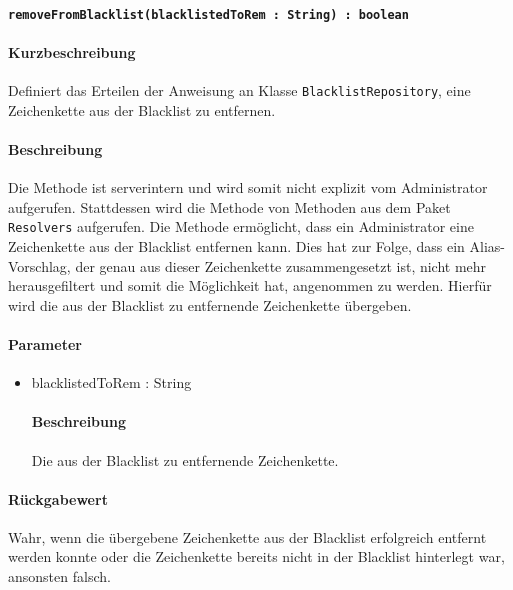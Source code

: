 \paragraph{\texttt{removeFromBlacklist(blacklistedToRem : String) : boolean}}%
\paragraph*{Kurzbeschreibung}
Definiert das Erteilen der Anweisung an Klasse \texttt{BlacklistRepository}, eine Zeichenkette aus der Blacklist zu entfernen.
\paragraph*{Beschreibung}
Die Methode ist serverintern und wird somit nicht explizit vom Administrator aufgerufen.
Stattdessen wird die Methode von Methoden aus dem Paket \texttt{Resolvers} aufgerufen.
Die Methode ermöglicht, dass ein Administrator eine Zeichenkette aus der Blacklist entfernen kann.
Dies hat zur Folge, dass ein Alias-Vorschlag, der genau aus dieser Zeichenkette zusammengesetzt ist, nicht mehr herausgefiltert und somit die Möglichkeit hat, angenommen zu werden.
Hierfür wird die aus der Blacklist zu entfernende Zeichenkette übergeben.
\paragraph*{Parameter}
\begin{itemize}
    \item blacklistedToRem : String
    		\paragraph*{Beschreibung}
    		Die aus der Blacklist zu entfernende Zeichenkette.
\end{itemize}
\paragraph*{Rückgabewert}
Wahr, wenn die übergebene Zeichenkette aus der Blacklist erfolgreich entfernt werden konnte oder die Zeichenkette bereits nicht in der Blacklist hinterlegt war, ansonsten falsch.

